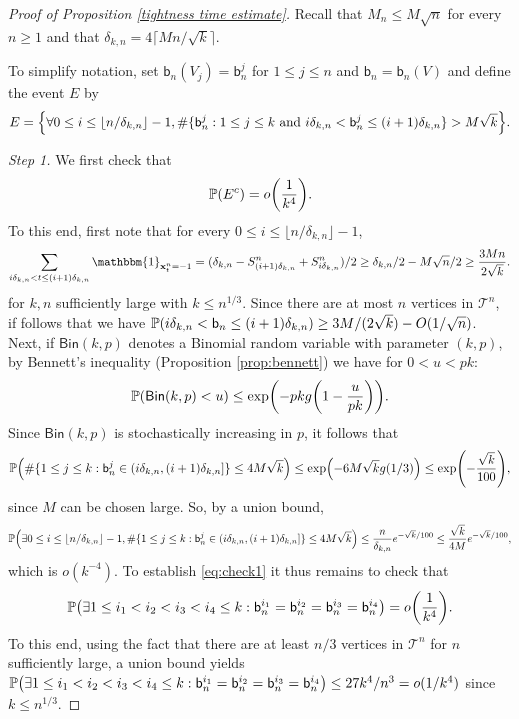 \documentclass[11pt]{article}
\theoremstyle{plain}
\theoremstyle{definition}
\theoremstyle{remark}
\newcommand{\1}{\mathbbm{1}} %
\newcommand{\proba}[1]{\mathbb{P}\left(#1\right)} %
\newcommand{\T}{\mathcal{T}} %
\newcommand{\birth}{\mathsf{b}} %
\newcommand{\Xb}{\mathrm{\mathbf{x}}} %
\let\originalleft\left
\let\originalright\right
\renewcommand{\left}{\mathopen{}\mathclose\bgroup\originalleft}
\renewcommand{\right}{\aftergroup\egroup\originalright}
\begin{document}
\begin{proof}[Proof of Proposition \ref{tightness time estimate}]
{Recall that  $ M_{n} \leq  M \sqrt{n}$ for every $n \geq 1$ and that  $\delta_{k,n}= 4 \lceil  M n/\sqrt{k} \rceil$.}

 
 To simplify notation, set $\birth_n(V_j)=\birth_{n}^{j}$ for $1 \leq j \leq n$ and $\birth_{n}=\birth_{n}(V)$ and define the event $E$ by
{ \[
E= \left\{\forall 0\leq i \leq \lfloor n/\delta_{k,n}\rfloor-1, \#  \{\birth_{n}^{j} : 1\leq j \leq k \textrm{ and } i\delta_{k,n} < \birth_{n}^{j}  \leq (i+1)\delta_{k,n} \} >  M \sqrt{k}\right\}.
\]}

\emph{Step 1.} We first check that
\begin{equation}
\label{eq:check1}
\proba{E^{c}}= o \left(  \frac{1}{ k^{4}}\right).
\end{equation}
To this end, first note that for every $0\leq i \leq \lfloor n/\delta_{k,n}\rfloor-1$,
\[ \sum_{i\delta_{k,n} <t\leq (i+1) \delta_{k,n}} \1_{\Xb^{n}_t=-1}= (\delta_{k,n}-S^{n}_{(i+1)\delta_{k,n}}+S^{n}_{i\delta_{k,n}})/2  \geq \delta_{k,n}/2-M \sqrt{n}/2 \geq \frac{3 M n}{2 \sqrt{k}}.  \]
for $k,n$ sufficiently large with $k \leq n^{1/3}$.
Since there are at most $n$ vertices in $\T^n$, if follows that we have
$\proba{i\delta_{k,n} < \birth_{n}  \leq (i+1) \delta_{k,n}} \geq {3M}/({2\sqrt{k}})-O(1/\sqrt{n})$.
Next,  if $\mathsf{Bin}(k,p)$ denotes a Binomial random variable with parameter $(k,p)$, by Bennett's inequality (Proposition \ref{prop:bennett}) we have for $0 <u < pk$:
\[ \proba{\mathsf{Bin}(k,p)<u } \leq \exp \left( - pk g \left( 1- \frac{u}{pk} \right) \right).\]
Since $\mathsf{Bin}(k,p)$ is stochastically increasing in $p$, it follows that
\[
 \proba{\#\{ 1 \leq j \leq k: \birth_{n}^{j} \in (i\delta_{k,n} ,(i+1)\delta_{k,n}]\} \leq {4}M \sqrt{k} }\leq \exp \left( -   {  {6} M \sqrt{k}} g(1/3) \right) \leq \exp \left( - \frac{\sqrt{k}}{100}\right),
 \]
 since $M$ can be chosen large.
So, by a union bound,
\[\proba{ \exists 0\leq i \leq \lfloor n/\delta_{k,n}\rfloor-1,\#\{ 1 \leq j \leq k: \birth_{n}^{j} \in (i\delta_{k,n} ,(i+1)\delta_{k,n}]\} \leq   {4} M \sqrt{k} }   \leq
 \frac{n}{\delta_{k,n}}  e^{-\sqrt{k}/100} \leq  \frac{\sqrt{k}}{4M}e^{-\sqrt{k}/100}, \]
 which is $o(k^{-4})$. To establish \eqref{eq:check1} it thus remains to check that
 \[
 {\proba{ \exists 1 \leq  i_{1} < i_{2} < i_{3} <  i_{4} \leq k : \birth_{n}^{i_{1}}= \birth_{n}^{i_{2}}=\birth_{n}^{i_{3}} =\birth_{n}^{i_{4}}}= o \left(  \frac{1}{k^{4}}\right).}
 \]  
 To this end, using the fact that there are at least $n/3$ vertices in $\T^{n}$ for $n$ sufficiently large, a union bound yields {$\proba{ \exists 1 \leq  i_{1} < i_{2} < i_{3} <  i_{4} \leq k : \birth_{n}^{i_{1}}= \birth_{n}^{i_{2}}=\birth_{n}^{i_{3}} =\birth_{n}^{i_{4}}} \leq  27 k^{4}/n^{3} =o(1/k ^{4})$ since $k \leq n^{1/3}$}.



\end{proof}
\end{document}
